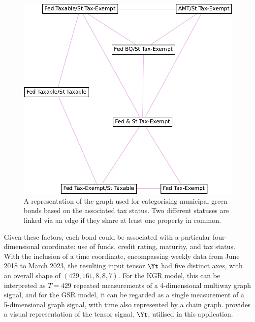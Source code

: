 \begin{figure}[b]  
    \begin{center}
        \includegraphics[width=0.66\linewidth]{Figures/tax_graph.pdf}
    \end{center}
   \caption[Graph categorising green bonds based on tax status]{A representation of the graph used for categorising municipal green bonds based on the associated tax status. Two different statuses are linked via an edge if they share at least one property in common. } 
    \label{fig:tax_graph}
\end{figure} 


\newpage 

\phantom{blabla}

\newpage


Given these factors, each bond could be associated with a particular four-dimensional coordinate: use of funds, credit rating, maturity, and tax status. With the inclusion of a time coordinate, encompassing weekly data from June 2018 to March 2023, the resulting input tensor $\Yt$ had five distinct axes, with an overall shape of $(429, 161, 8, 8, 7)$. For the KGR model, this can be interpreted as $T=429$ repeated measurements of a 4-dimensional multiway graph signal, and for the GSR model, it can be regarded as a single measurement of a 5-dimensional graph signal, with time also represented by a chain graph.  provides a visual representation of the tensor signal, $\Yt$, utilised in this application.

